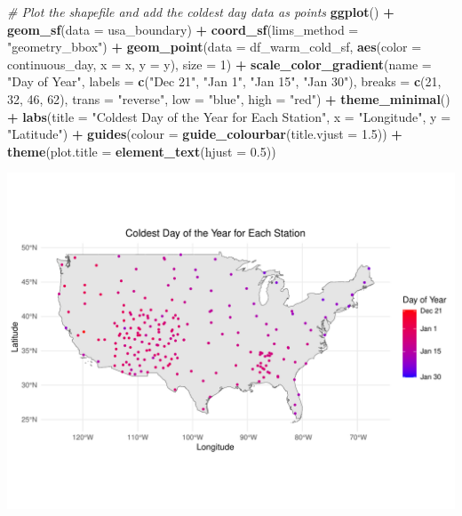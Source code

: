 \documentclass[
]{article}
\newenvironment{Shaded}{\begin{snugshade}}{\end{snugshade}}
\newcommand{\AttributeTok}[1]{\textcolor[rgb]{0.13,0.29,0.53}{#1}}
\newcommand{\CommentTok}[1]{\textcolor[rgb]{0.56,0.35,0.01}{\textit{#1}}}
\newcommand{\DecValTok}[1]{\textcolor[rgb]{0.00,0.00,0.81}{#1}}
\newcommand{\FloatTok}[1]{\textcolor[rgb]{0.00,0.00,0.81}{#1}}
\newcommand{\FunctionTok}[1]{\textcolor[rgb]{0.13,0.29,0.53}{\textbf{#1}}}
\newcommand{\NormalTok}[1]{#1}
\newcommand{\SpecialCharTok}[1]{\textcolor[rgb]{0.81,0.36,0.00}{\textbf{#1}}}
\newcommand{\StringTok}[1]{\textcolor[rgb]{0.31,0.60,0.02}{#1}}
\begin{document}
\begin{Shaded}
\begin{Highlighting}[]
\CommentTok{\# Plot the shapefile and add the coldest day data as points}
\FunctionTok{ggplot}\NormalTok{() }\SpecialCharTok{+}
  \FunctionTok{geom\_sf}\NormalTok{(}\AttributeTok{data =}\NormalTok{ usa\_boundary) }\SpecialCharTok{+}
  \FunctionTok{coord\_sf}\NormalTok{(}\AttributeTok{lims\_method =} \StringTok{"geometry\_bbox"}\NormalTok{) }\SpecialCharTok{+}
  \FunctionTok{geom\_point}\NormalTok{(}\AttributeTok{data =}\NormalTok{ df\_warm\_cold\_sf, }
             \FunctionTok{aes}\NormalTok{(}\AttributeTok{color =}\NormalTok{ continuous\_day, }\AttributeTok{x =}\NormalTok{ x, }\AttributeTok{y =}\NormalTok{ y), }\AttributeTok{size =} \DecValTok{1}\NormalTok{) }\SpecialCharTok{+}
  \FunctionTok{scale\_color\_gradient}\NormalTok{(}\AttributeTok{name =} \StringTok{"Day of Year"}\NormalTok{,}
                       \AttributeTok{labels =} \FunctionTok{c}\NormalTok{(}\StringTok{"Dec 21"}\NormalTok{, }\StringTok{"Jan 1"}\NormalTok{, }\StringTok{"Jan 15"}\NormalTok{, }\StringTok{"Jan 30"}\NormalTok{),}
                       \AttributeTok{breaks =} \FunctionTok{c}\NormalTok{(}\DecValTok{21}\NormalTok{, }\DecValTok{32}\NormalTok{, }\DecValTok{46}\NormalTok{, }\DecValTok{62}\NormalTok{),}
                       \AttributeTok{trans =} \StringTok{"reverse"}\NormalTok{, }\AttributeTok{low =} \StringTok{"blue"}\NormalTok{, }\AttributeTok{high =} \StringTok{"red"}\NormalTok{) }\SpecialCharTok{+}
  \FunctionTok{theme\_minimal}\NormalTok{() }\SpecialCharTok{+}
  \FunctionTok{labs}\NormalTok{(}\AttributeTok{title =} \StringTok{"Coldest Day of the Year for Each Station"}\NormalTok{, }
       \AttributeTok{x =} \StringTok{"Longitude"}\NormalTok{, }\AttributeTok{y =} \StringTok{"Latitude"}\NormalTok{) }\SpecialCharTok{+} 
  \FunctionTok{guides}\NormalTok{(}\AttributeTok{colour =} \FunctionTok{guide\_colourbar}\NormalTok{(}\AttributeTok{title.vjust =} \FloatTok{1.5}\NormalTok{)) }\SpecialCharTok{+}
  \FunctionTok{theme}\NormalTok{(}\AttributeTok{plot.title =} \FunctionTok{element\_text}\NormalTok{(}\AttributeTok{hjust =} \FloatTok{0.5}\NormalTok{))}
\end{Highlighting}
\end{Shaded}

\includegraphics{seesaw_files/figure-latex/unnamed-chunk-7-1.pdf}
\end{document}
